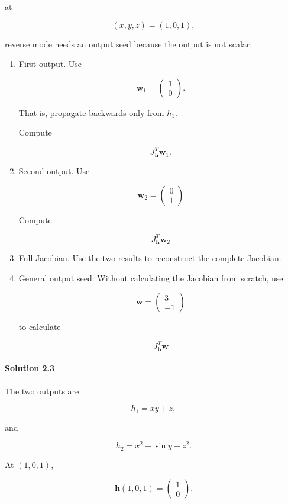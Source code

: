 \documentclass[10pt]{article}
\begin{document}
at

\[
(x,y,z)=(1,0,1),
\]

reverse mode needs an output seed because the output is not scalar.

\begin{enumerate}
\item
First output. Use

\[
\mathbf w_1 = \begin{pmatrix}1\\0\end{pmatrix}.
\]

That is, propagate backwards only from $h_1$.

Compute

\[
J_{\mathbf h}^T\mathbf w_1.
\]

\item
Second output. Use

\[
\mathbf w_2 = \begin{pmatrix}0\\1\end{pmatrix}
\]

Compute

\[
J_{\mathbf h}^T\mathbf w_2
\]

\item
Full Jacobian. Use the two results to reconstruct the complete Jacobian.

\item
General output seed. Without calculating the Jacobian from scratch, use

\[
\mathbf w = \begin{pmatrix}3\\-1\end{pmatrix}
\]

to calculate

\[
J_{\mathbf h}^T\mathbf w
\]

\end{enumerate}

\begingroup\color{red}
\paragraph*{Solution 2.3}
The two outputs are

\[
h_1=xy+z,
\]

and

\[
h_2=x^2+\sin y-z^2.
\]

At $(1,0,1)$,

\[
\mathbf h(1,0,1)
=
\begin{pmatrix}1\\0\end{pmatrix}.
\]
\end{document}
